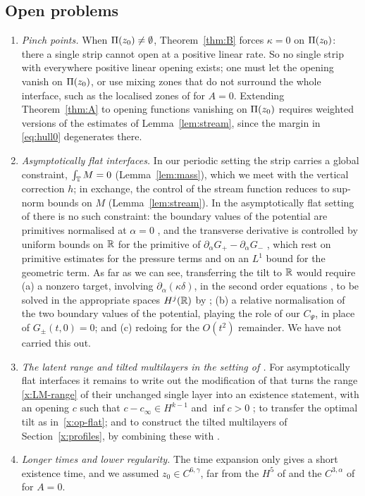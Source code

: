 \subsection{Open problems}
\begin{enumerate}[label=(\arabic*),leftmargin=*]
\item \emph{Pinch points.} When $\Pi(z_0)\ne\emptyset$, Theorem~\ref{thm:B} forces $\kappa=0$ on $\Pi(z_0)$: there a single strip cannot open at a positive linear rate. So no single strip
with everywhere positive linear opening exists; one must let the opening vanish on $\Pi(z_0)$, or use mixing zones that do not surround the whole interface, such as the localised zones of
\cite{CFM22} for $A=0$. Extending Theorem~\ref{thm:A} to opening functions vanishing on $\Pi(z_0)$ requires weighted versions of the estimates of Lemma~\ref{lem:stream}, since the margin in
\eqref{eq:hull0} degenerates there.
\item\label{x:op-flat} \emph{Asymptotically flat interfaces.} In our periodic setting the strip carries a global constraint, $\int_{\mathbb{T}} M=0$ (Lemma~\ref{lem:mass}), which we meet with the vertical
correction $h$; in exchange, the control of the stream function reduces to sup-norm bounds on $M$ (Lemma~\ref{lem:stream}). In the asymptotically flat setting of \cite{LM26} there is no such
constraint: the boundary values of the potential are primitives normalised at $\alpha=0$ \cite[(4.13)]{LM26}, and the transverse derivative is controlled by uniform bounds on $\mathbb{R}$ for the
primitive of $\partial_\alpha G_+-\partial_\alpha G_-$ \cite[Prop.~7.2]{LM26}, which rest on primitive estimates for the pressure terms \cite[Lemmas~8.2 and~8.6]{LM26} and on an $L^1$ bound for
the geometric term. As far as we can see, transferring the tilt to $\mathbb{R}$ would require (a) a nonzero target, involving $\partial_\alpha(\kappa\delta)$, in the second order equations
\cite[(5.15)--(5.16)]{LM26}, to be solved in the appropriate spaces $H^j(\mathbb{R})$ by \cite[Prop.~6.1]{LM26}; (b) a relative normalisation of the two boundary values of the potential, playing the role of
our $C_\Psi$, in place of $G_\pm(t,0)=0$; and (c) redoing \cite[Prop.~7.2]{LM26} for the $O(t^2)$ remainder. We have not carried this out.
\item\label{x:op-latent} \emph{The latent range and tilted multilayers in the setting of \cite{LM26}.} For asymptotically flat interfaces it remains to write out the modification of \cite[Sec.~7.4]{LM26} that turns
the range \eqref{x:LM-range} of their unchanged single layer into an existence statement, with an opening $c$ such that $c-c_\infty\in H^{k-1}$ and $\inf c>0$ \cite[Sec.~4.1 and (5.1)]{LM26}; to
transfer the optimal tilt as in~\ref{x:op-flat}; and to construct the tilted multilayers of Section~\ref{x:profiles}, by combining these with \cite[Sec.~7.5 and Lemma~8.8]{LM26}.
\item \emph{Longer times and lower regularity.} The time expansion only gives a short existence time, and we assumed $z_0\in C^{6,\gamma}$, far from the $H^5$ of \cite{LM26} and the $C^{3,\alpha}$ of \cite{FS18} for $A=0$.
\end{enumerate}
